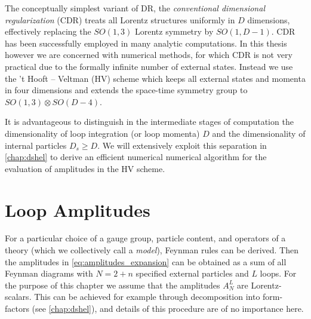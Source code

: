 The conceptually simplest variant of DR, the \emph{conventional dimensional regularization} (CDR)
treats all Lorentz structures uniformly in $D$ dimensions, effectively replacing the $SO(1,3)$ Lorentz symmetry by $SO(1,D-1)$.
CDR has been successfully employed in many analytic computations.
In this thesis however we are concerned with numerical methods, for which CDR is not very practical due to the
formally infinite number of external states.
Instead we use the 't Hooft -- Veltman (HV) scheme which keeps all external states and momenta in four dimensions and
extends the space-time symmetry group to $SO(1,3)\otimes SO(D-4)$.

It is advantageous to distinguish in the intermediate stages of computation the dimensionality of loop integration (or loop momenta) $D$ and
the dimensionality of internal particles $D_s \geq  D$.
We will extensively exploit this separation in \cref{chap:dshel} to derive an efficient numerical numerical algorithm
for the evaluation of amplitudes in the HV scheme.


\section{Loop Amplitudes}

For a particular choice of a gauge group, particle content, and operators of
a theory (which we collectively call a \emph{model}), Feynman rules can be derived.
Then the amplitudes in \cref{eq:amplitudes_expansion} can be obtained as a sum of all Feynman diagrams
with $N = 2+n$ specified external particles and $L$ loops.
For the purpose of this chapter we assume that the amplitudes $A^{L}_N$ are Lorentz-scalars.
This can be achieved for example through decomposition into form-factors (see \cref{chap:dshel}),
and details of this procedure are of no importance here.

